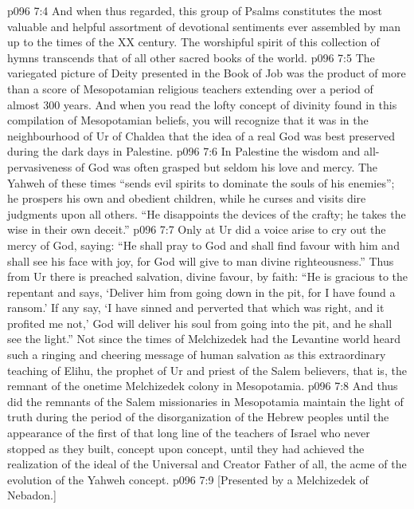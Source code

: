 \vs p096 7:4 And when thus regarded, this group of Psalms constitutes the most valuable and helpful assortment of devotional sentiments ever assembled by man up to the times of the XX century. The worshipful spirit of this collection of hymns transcends that of all other sacred books of the world.
\vs p096 7:5 \pc The variegated picture of Deity presented in the Book of Job was the product of more than a score of Mesopotamian religious teachers extending over a period of almost 300 years. And when you read the lofty concept of divinity found in this compilation of Mesopotamian beliefs, you will recognize that it was in the neighbourhood of Ur of Chaldea that the idea of a real God was best preserved during the dark days in Palestine.
\vs p096 7:6 In Palestine the wisdom and all\hyp{}pervasiveness of God was often grasped but seldom his love and mercy. The Yahweh of these times “sends evil spirits to dominate the souls of his enemies”; he prospers his own and obedient children, while he curses and visits dire judgments upon all others. “He disappoints the devices of the crafty; he takes the wise in their own deceit.”
\vs p096 7:7 Only at Ur did a voice arise to cry out the mercy of God, saying: “He shall pray to God and shall find favour with him and shall see his face with joy, for God will give to man divine righteousness.” Thus from Ur there is preached salvation, divine favour, by faith: “He is gracious to the repentant and says, ‘Deliver him from going down in the pit, for I have found a ransom.’ If any say, ‘I have sinned and perverted that which was right, and it profited me not,’ God will deliver his soul from going into the pit, and he shall see the light.” Not since the times of Melchizedek had the Levantine world heard such a ringing and cheering message of human salvation as this extraordinary teaching of Elihu, the prophet of Ur and priest of the Salem believers, that is, the remnant of the onetime Melchizedek colony in Mesopotamia.
\vs p096 7:8 And thus did the remnants of the Salem missionaries in Mesopotamia maintain the light of truth during the period of the disorganization of the Hebrew peoples until the appearance of the first of that long line of the teachers of Israel who never stopped as they built, concept upon concept, until they had achieved the realization of the ideal of the Universal and Creator Father of all, the acme of the evolution of the Yahweh concept.
\vsetoff
\vs p096 7:9 [Presented by a Melchizedek of Nebadon.]
